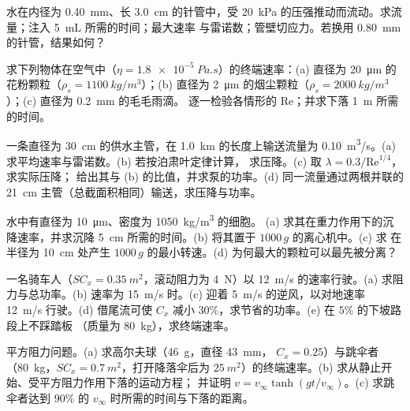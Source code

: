 \begin{exercise}[$\star$]\label{exo:b2:viscous-flows:3}
水在内径为 \qty{0.40}{mm}、长 \qty{3.0}{cm} 的针管中，受 
\qty{20}{kPa} 的压强推动而流动。求流量；注入 \qty{5}{mL} 所需的时间；最大速率
与雷诺数；管壁切应力。若换用 \qty{0.80}{mm} 的针管，结果如何？
\end{exercise}

\begin{exercise}[$\star$]\label{exo:b2:viscous-flows:4}
求下列物体在空气中（$\eta = \qty{1.8e-5}{Pa.s}$）的终端速率：(a) 直径为 \qty{20}{\micro m} 
的花粉颗粒（$\rho_s = \qty{1100}{kg/m^3}$）；(b) 直径为 \qty{2}{\micro m} 
的烟尘颗粒（$\rho_s = \qty{2000}{kg/m^3}$）；(c) 直径为 \qty{0.2}{mm} 的毛毛雨滴。
逐一检验各情形的 $\mathrm{Re}$；并求下落 \qty{1}{m} 所需的时间。
\end{exercise}

\begin{exercise}[$\star\star$]\label{exo:b2:viscous-flows:5}
一条直径为 \qty{30}{cm} 的供水主管，在 
\qty{1.0}{km} 的长度上输送流量为 \qty{0.10}{m^3/s}。(a) 求平均速率与雷诺数。(b) 若按泊肃叶定律计算，
求压降。(c) 取 $\lambda = 0.3/\mathrm{Re}^{1/4}$，求实际压降；
给出其与 (b) 的比值，并求泵的功率。(d) 同一流量通过两根并联的 
\qty{21}{cm} 主管（总截面积相同）输送，求压降与功率。
\end{exercise}

\begin{exercise}[$\star\star$]\label{exo:b2:viscous-flows:6}
水中有直径为 \qty{10}{\micro m}、密度为 \qty{1050}{kg/m^3} 的细胞。
(a) 求其在重力作用下的沉降速率，并求沉降 \qty{5}{cm} 所需的时间。(b) 将其置于 
$1000\,g$ 的离心机中。(c) 求
在半径为 \qty{10}{cm} 处产生 $1000\,g$ 的最小转速。(d) 为何最大的颗粒可以最先被分离？
\end{exercise}

\begin{exercise}[$\star\star$]\label{exo:b2:viscous-flows:7}
一名骑车人（$SC_x = \qty{0.35}{m^2}$，滚动阻力为 \qty{4}{N}）以 
\qty{12}{m/s} 的速率行驶。(a) 求阻力与总功率。(b) 速率为 \qty{15}{m/s} 时。(c) 迎着 
\qty{5}{m/s} 的逆风，以对地速率 \qty{12}{m/s} 行驶。(d) 借尾流可使 
$C_x$ 减小 $30\%$，求节省的功率。(e) 在 $5\%$ 的下坡路段上不踩踏板
（质量为 \qty{80}{kg}），求终端速率。
\end{exercise}

\begin{exercise}[$\star\star$]\label{exo:b2:viscous-flows:8}
平方阻力问题。(a) 求高尔夫球（\qty{46}{g}，直径 \qty{43}{mm}，
$C_x = 0.25$）与跳伞者（\qty{80}{kg}，$SC_x = \qty{0.7}{m^2}$，打开降落伞后为 
$\qty{25}{m^2}$）的终端速率。(b) 求从静止开始、受平方阻力作用下落的运动方程；
并证明 $v = v_\infty\tanh(gt/v_\infty)$。(c) 求跳伞者达到 
$90\%$ 的 $v_\infty$ 时所需的时间与下落的距离。
\end{exercise}

